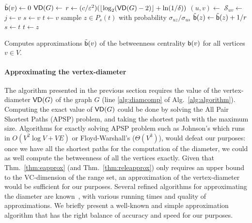 \begin{algorithm}[ht]
   \DontPrintSemicolon
  {
  $\tilde{\mathsf{b}}(v)\leftarrow 0$
  }
  $\mathsf{VD}(G)\leftarrow$\label{alg:diamcomp}\; 
  $r\leftarrow (c/\varepsilon^2)(\lfloor\log_2(\mathsf{VD}(G)-2)\rfloor+\ln(1/\delta))$\;
  {\label{algline:forloop}
  $(u,v)\leftarrow$\;
  $\mathcal{S}_{uv}\leftarrow$\label{algline:shortestpaths}\;
  {
  $j\leftarrow v$\;
  $s\leftarrow v$\;
  $t\leftarrow v$\;
   {
  sample $z\in P_s(t)$ with probability $\sigma_{uz}/\sigma_{us}$\;
   {
  $\tilde{\mathsf{b}}(z) \leftarrow \tilde{\mathsf{b}}(z)+1/r$\;
  $s\leftarrow t$\;
  $t\leftarrow z$\;
  }
  }
  }
  } %
  \caption{Computes approximations $\tilde{\mathsf{b}}(v)$ of the betweenness
  centrality $\mathsf{b}(v)$ for all vertices $v\in V$.}
  \label{alg:algorithm}
\end{algorithm}

\paragraph{Approximating the vertex-diameter}%
The algorithm presented in the previous section requires the value of the
vertex-diameter $\mathsf{VD}(G)$ of the graph $G$ (line
\ref{alg:diamcomp} of Alg.~\ref{alg:algorithm}). 
Computing the exact value of $\mathsf{VD}(G)$ could be done by solving the All Pair
Shortest Paths (APSP) problem, and taking the shortest path with the maximum size.
Algorithms for exactly solving APSP problem such as Johnson's which runs in
$O(V^2\log V+VE)$ or Floyd-Warshall's ($\Theta(V^3)$), would defeat our
purposes: once we have all the shortest paths for the computation of
the diameter, we could as well compute the betweenness of all the vertices exactly. 
Given that Thm.~\ref{thm:eapprox} (and Thm.~\ref{thm:releapprox})  only
requires an upper bound to the VC-dimension of the range set, an approximation
of the vertex-diameter would be sufficient for our purposes. Several refined
algorithms for approximating the diameter are
known~\citep{AingwordCIM99,BoitmanisFL06,RodittyW12}, with various running times
and quality of approximations. We briefly present a well-known and simple
approximation algorithm that has the right balance of accuracy and speed
for our purposes.

